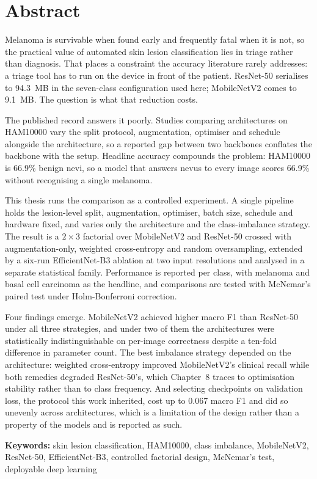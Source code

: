 \chapter*{Abstract}

Melanoma is survivable when found early and frequently fatal when it is not, so the
practical value of automated skin lesion classification lies in triage rather than
diagnosis. That places a constraint the accuracy literature rarely addresses: a triage
tool has to run on the device in front of the patient. ResNet-50 serialises to 94.3~MB
in the seven-class configuration used here; MobileNetV2 comes to 9.1~MB. The question is
what that reduction costs.

The published record answers it poorly. Studies comparing architectures on HAM10000 vary
the split protocol, augmentation, optimiser and schedule alongside the architecture, so a
reported gap between two backbones conflates the backbone with the setup. Headline
accuracy compounds the problem: HAM10000 is 66.9\% benign nevi, so a model that answers
nevus to every image scores 66.9\% without recognising a single melanoma.

This thesis runs the comparison as a controlled experiment. A single pipeline holds the
lesion-level split, augmentation, optimiser, batch size, schedule and hardware fixed, and
varies only the architecture and the class-imbalance strategy. The result is a
$2\times3$ factorial over MobileNetV2 and ResNet-50 crossed with augmentation-only,
weighted cross-entropy and random oversampling, extended by a six-run EfficientNet-B3
ablation at two input resolutions and analysed in a separate statistical family.
Performance is reported per class, with melanoma and basal cell carcinoma as the
headline, and comparisons are tested with McNemar's paired test under Holm-Bonferroni
correction.

Four findings emerge. MobileNetV2 achieved higher macro F1 than ResNet-50 under all
three strategies, and under two of them the architectures were statistically
indistinguishable on per-image correctness despite a ten-fold difference in parameter
count. The best imbalance strategy depended on the architecture: weighted cross-entropy
improved MobileNetV2's clinical recall while both remedies degraded ResNet-50's, which
Chapter~8 traces to optimisation stability rather than to class frequency. And selecting
checkpoints on validation loss, the protocol this work inherited, cost up to 0.067 macro
F1 and did so unevenly across architectures, which is a limitation of the design rather
than a property of the models and is reported as such.

\vspace{1em}
\noindent\textbf{Keywords:} skin lesion classification, HAM10000, class imbalance,
MobileNetV2, ResNet-50, EfficientNet-B3, controlled factorial design, McNemar's test,
deployable deep learning
